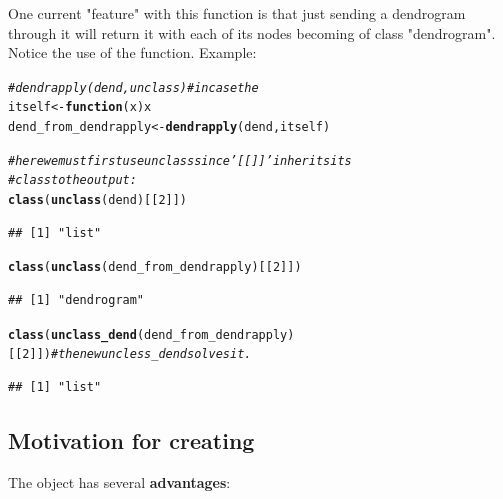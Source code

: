 \documentclass[shortnames,nojss,article]{jss}\usepackage[]{graphicx}\usepackage[]{color}
\makeatletter
\newcommand{\hlnum}[1]{\textcolor[rgb]{0.686,0.059,0.569}{#1}}%
\newcommand{\hlcom}[1]{\textcolor[rgb]{0.678,0.584,0.686}{\textit{#1}}}%
\newcommand{\hlstd}[1]{\textcolor[rgb]{0.345,0.345,0.345}{#1}}%
\newcommand{\hlkwa}[1]{\textcolor[rgb]{0.161,0.373,0.58}{\textbf{#1}}}%
\newcommand{\hlkwb}[1]{\textcolor[rgb]{0.69,0.353,0.396}{#1}}%
\newcommand{\hlkwc}[1]{\textcolor[rgb]{0.333,0.667,0.333}{#1}}%
\newcommand{\hlkwd}[1]{\textcolor[rgb]{0.737,0.353,0.396}{\textbf{#1}}}%
\newenvironment{kframe}{%
 \def\at@end@of@kframe{}%
 \ifinner\ifhmode%
  \def\at@end@of@kframe{\end{minipage}}%
  \begin{minipage}{\columnwidth}%
 \fi\fi%
 \def\FrameCommand##1{\hskip\@totalleftmargin \hskip-\fboxsep
 \colorbox{shadecolor}{##1}\hskip-\fboxsep
     \hskip-\linewidth \hskip-\@totalleftmargin \hskip\columnwidth}%
 \MakeFramed {\advance\hsize-\width
   \@totalleftmargin\z@ \linewidth\hsize
   \@setminipage}}%
 {\par\unskip\endMakeFramed%
 \at@end@of@kframe}
\newenvironment{knitrout}{}{} %
\makeatother
\begin{document}
One current "feature" with this function is that just sending a dendrogram through it will return it with each of its nodes becoming of class "dendrogram". Notice the use of the  function. Example:

\begin{knitrout}
\color{fgcolor}\begin{kframe}
\begin{alltt}
\hlcom{# dendrapply(dend, unclass) # in case the}
\hlstd{itself} \hlkwb{<-} \hlkwa{function}\hlstd{(}\hlkwc{x}\hlstd{) x}
\hlstd{dend_from_dendrapply} \hlkwb{<-} \hlkwd{dendrapply}\hlstd{(dend, itself}\hlstd{)}

\hlcom{# here we must first use unclass since '[[]]' inherits its}
\hlcom{# class to the output:}
\hlkwd{class}\hlstd{(}\hlkwd{unclass}\hlstd{(dend)[[}\hlnum{2}\hlstd{]])}
\end{alltt}
\begin{verbatim}
## [1] "list"
\end{verbatim}
\begin{alltt}
\hlkwd{class}\hlstd{(}\hlkwd{unclass}\hlstd{(dend_from_dendrapply)[[}\hlnum{2}\hlstd{]])}
\end{alltt}
\begin{verbatim}
## [1] "dendrogram"
\end{verbatim}
\begin{alltt}
\hlkwd{class}\hlstd{(}\hlkwd{unclass_dend}\hlstd{(dend_from_dendrapply)[[}\hlnum{2}\hlstd{]])}  \hlcom{# the new uncless_dend solves it.}
\end{alltt}
\begin{verbatim}
## [1] "list"
\end{verbatim}
\end{kframe}
\end{knitrout}




\subsection{Motivation for creating }



The  object has several \textbf{advantages}:
\end{document}
